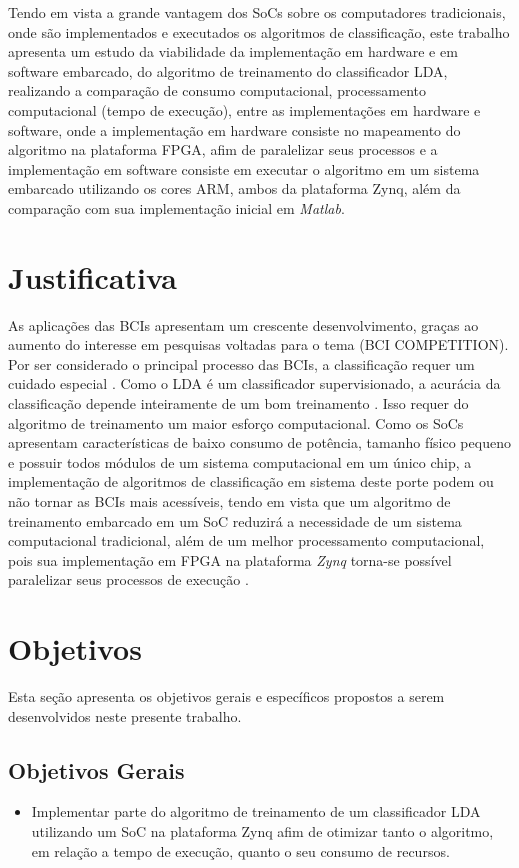 Tendo em vista a grande vantagem dos SoCs sobre os computadores tradicionais, onde são implementados e executados os algoritmos de classificação, este trabalho apresenta um estudo da viabilidade da implementação em hardware e em software embarcado, do algoritmo de treinamento do classificador LDA, realizando a comparação de consumo computacional, processamento computacional (tempo de execução), entre as implementações em hardware e software, onde a implementação em hardware consiste no mapeamento do algoritmo na plataforma FPGA, afim de paralelizar seus processos e a implementação em software consiste em executar o algoritmo em um sistema embarcado utilizando os cores ARM, ambos da plataforma Zynq, além da comparação com sua implementação inicial em \textit{Matlab}.


\section{Justificativa}
As aplicações das BCIs apresentam um crescente desenvolvimento, graças ao aumento do interesse em pesquisas voltadas para o tema (BCI COMPETITION). Por ser considerado o principal processo das BCIs, a classificação requer um cuidado especial \cite{MasonAndBirch}. Como o LDA é um classificador supervisionado, a acurácia da classificação depende inteiramente de um bom treinamento \cite{F.Lotte}. Isso requer do algoritmo de treinamento um maior esforço computacional. Como os SoCs apresentam características de baixo consumo de potência, tamanho físico pequeno e possuir todos módulos de um sistema computacional em um único chip, a implementação de algoritmos de classificação em sistema deste porte podem ou não tornar as BCIs mais acessíveis, tendo em vista que um algoritmo de treinamento embarcado em um SoC reduzirá a necessidade de um sistema computacional tradicional, além de um melhor processamento computacional, pois sua implementação em FPGA na plataforma \textit{Zynq} torna-se possível paralelizar seus processos de execução \cite{zynqBook}.

\section{Objetivos}
Esta seção apresenta os objetivos gerais e específicos propostos a serem desenvolvidos neste
 presente trabalho.
\subsection{Objetivos Gerais}
\begin{itemize}
	\item Implementar parte do algoritmo de treinamento de um classificador LDA utilizando um SoC na plataforma Zynq afim de otimizar tanto o algoritmo, em relação a tempo de execução, quanto o seu consumo de recursos.
\end{itemize} 
